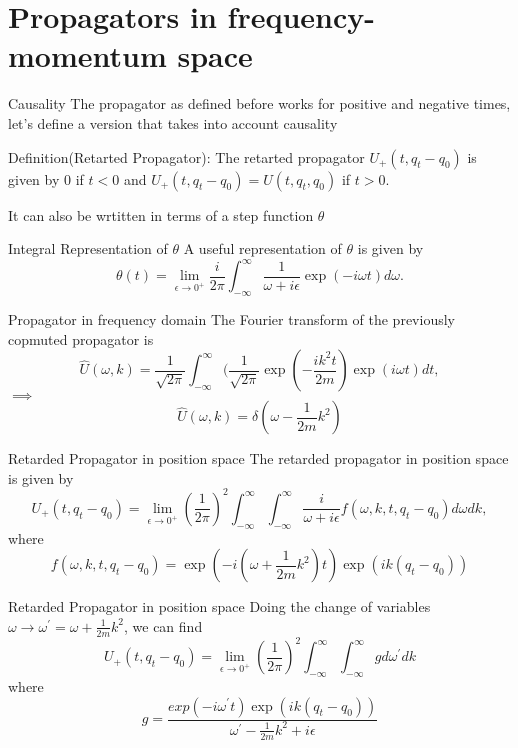\documentclass[12pt]{beamer}
\begin{document}
\section{Propagators in frequency-momentum space}
\begin{frame}{Causality}
The propagator as defined before works for positive and negative times, let's define a version that takes into account causality

Definition(Retarted Propagator): The retarted propagator $U_{+}(t,q_t-q_0)$ is given by $0$ if $t<0$ and $U_{+}(t,q_t-q_0)=U(t,q_t,q_0)$ if $t>0$.

It can also be wrtitten in terms of a step function $\theta$
\end{frame}
\begin{frame}{Integral Representation of $\theta$}
A useful representation of $\theta$ is given by 
\begin{displaymath}
  \theta(t) = \lim_{\epsilon\rightarrow 0^{+}}\frac{i}{2\pi}\int_{-\infty}^{\infty}\frac{1}{\omega + i\epsilon}\exp(-i\omega t)d\omega.
\end{displaymath}	
\end{frame}
\begin{frame}{Propagator in frequency domain}
The Fourier transform of the previously copmuted propagator is
\begin{displaymath}
  \hat U(\omega,k) = \frac{1}{\sqrt{2\pi}}\int_{-\infty}^{\infty}(\frac{1}{\sqrt{2\pi}}\exp(-\frac{ik^2 t}{2m})\exp(i\omega t)dt,
\end{displaymath}
$\implies$ 
\begin{displaymath}
	\hat U(\omega,k) = \delta(\omega - \frac{1}{2m}k^2)  
\end{displaymath}
\end{frame}
\begin{frame}{Retarded Propagator in position space}
The retarded propagator in position space is given by 
\begin{displaymath}
  U_{+}(t,q_t - q_0) = \lim_{\epsilon\rightarrow 0^{+}}(\frac{1}{2\pi})^{2}\int_{-\infty}^{\infty}\int_{-\infty}^{\infty}\frac{i}{\omega + i\epsilon}f(\omega, k,t,q_t-q_0)d\omega dk,
\end{displaymath}
where 
\begin{displaymath}
f(\omega, k,t,q_t-q_0) = \exp(-i(\omega + \frac{1}{2m}k^2)t)\exp(ik(q_t-q_0))
\end{displaymath}
\end{frame}
\begin{frame}{Retarded Propagator in position space}
Doing the change of variables $\omega\rightarrow \omega^{\prime} =\omega + \frac{1}{2m}k^2$, we can find
\begin{displaymath}
  U_{+}(t,q_t - q_0) = \lim_{\epsilon\rightarrow 0^{+}}(\frac{1}{2\pi})^{2}\int_{-\infty}^{\infty}\int_{-\infty}^{\infty}g d\omega^{\prime} dk
\end{displaymath}
where \begin{displaymath}
  g=\frac{exp(-i\omega^{\prime} t)\exp(ik(q_t-q_0))}{\omega^{\prime}-\frac{1}{2m}k^2+i\epsilon}
\end{displaymath}
\end{frame}
\end{document}

